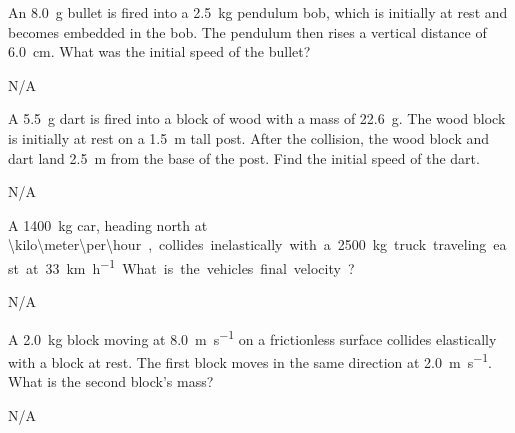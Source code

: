 



\begin{question}[ID=impulse-A-Q01,topic=impulse,difficulty=A]
    An \SI{8.0}{\gram} bullet is fired into a
        \SI{2.5}{\kilo\gram} pendulum bob,
        which is initially at rest and becomes
        embedded in the bob.
    The pendulum then rises a vertical distance of
        \SI{6.0}{\centi\meter}.
    What was the initial speed of the bullet?
\end{question}
\begin{solution}
    N/A
\end{solution}


\begin{question}[ID=impulse-A-Q02,topic=impulse,difficulty=A]
    A \SI{5.5}{\gram} dart is fired into a block of wood with
        a mass of \SI{22.6}{\gram}.
    The wood block is initially at rest on a \SI{1.5}{\meter}
        tall post.
    After the collision, the wood block and dart land 
        \SI{2.5}{\meter} from the base of the post.
    Find the initial speed of the dart.
\end{question}
\begin{solution}
    N/A
\end{solution}


\begin{question}[ID=impulse-A-Q03,topic=impulse,difficulty=A]
    A \SI{1400}{\kilo\gram} car, heading north at
        \SI{\kilo\meter\per\hour}, collides inelastically with
        a \SI{2500}{\kilo\gram} truck traveling east at
        \SI{33}{\kilo\meter\per\hour}.
    What is the vehicles final velocity?
\end{question}
\begin{solution}
    N/A
\end{solution}


\begin{question}[ID=impulse-A-Q04,topic=impulse,difficulty=A]
    A \SI{2.0}{\kilo\gram} block moving at \SI{8.0}{\meter\per\second}
        on a frictionless surface collides elastically with a block
        at rest.
    The first block moves in the same direction at
        \SI{2.0}{\meter\per\second}.
    What is the second block's mass?
\end{question}
\begin{solution}
    N/A
\end{solution}


